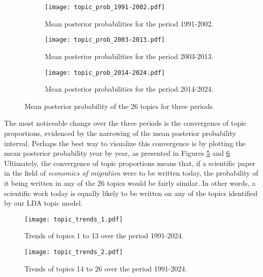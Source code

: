 \begin{figure}[ht!]
    \centering 
    \begin{subfigure}[b]{0.49\textwidth}
        \centering
        \texttt{[image: topic\_prob\_1991-2002.pdf]}
        \caption{Mean posterior probabilities for the period 1991-2002.}
        \label{fig:topics_posterior1991}
    \end{subfigure}
    \hfill 
    \begin{subfigure}[b]{0.49\textwidth}
        \centering
        \texttt{[image: topic\_prob\_2003-2013.pdf]}
        \caption{Mean posterior probabilities for the period 2003-2013.}
        \label{fig:topics_posterior2003}
    \end{subfigure}
    \hfill
    \begin{subfigure}[b]{0.49\textwidth}
        \centering
        \texttt{[image: topic\_prob\_2014-2024.pdf]}
        \caption{Mean posterior probabilities for the period 2014-2024.}
        \label{fig:topics_posterior2014}
    \end{subfigure}  
\caption{Mean posterior probability of the 26 topics for three periods.}
\label{fig:topics_posterior}
\end{figure}

The most noticeable change over the three periods is the convergence of topic proportions, evidenced by the narrowing of the mean posterior probability interval. Perhaps the best way to visualize this convergence is by plotting the mean posterior probability year by year, as presented in Figures \ref{fig:topic_trends_1} and \ref{fig:topic_trends_2}. Ultimately, the convergence of topic proportions means that, if a scientific paper in the field of \textit{economics of migration} were to be written today, the probability of it being written in any of the 26 topics would be fairly similar. In other words, a scientific work today is equally likely to be written on any of the topics identified by our LDA topic model.

\begin{figure}[ht!]
	\centering
	\texttt{[image: topic\_trends\_1.pdf]}
	\caption{Trends of topics 1 to 13 over the period 1991-2024.}
	\label{fig:topic_trends_1}
\end{figure}

\begin{figure}[ht!]
	\centering
	\texttt{[image: topic\_trends\_2.pdf]}
	\caption{Trends of topics 14 to 26 over the period 1991-2024.}
	\label{fig:topic_trends_2}
\end{figure}

